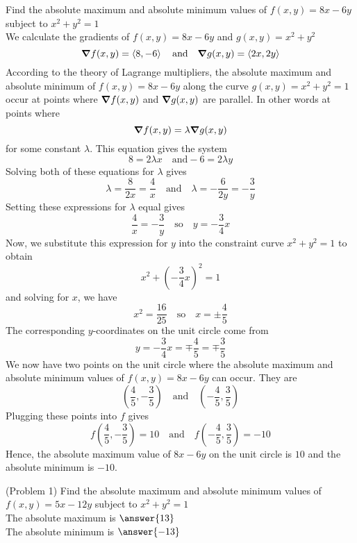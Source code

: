 \documentclass[handout]{ximera}
\begin{document}
\begin{example}[Example 1]
Find the absolute maximum and absolute minimum values of $f(x,y) = 8x - 6y$ subject to $x^2 + y^2 = 1$\\
We calculate the gradients of $f(x,y) = 8x - 6y$ and $g(x,y) = x^2 + y^2$
\[
\boldsymbol\nabla f(x,y) = \left\langle 8, -6\right\rangle \quad \text{and} \quad \boldsymbol\nabla g(x,y) = \left\langle 2x, 2y\right\rangle
\]
According to the theory of Lagrange multipliers, the absolute maximum and absolute minimum of $f(x,y) = 8x - 6y$
along the curve $g(x,y) = x^2 + y^2 = 1$ occur at points where $\boldsymbol\nabla f(x,y)$ and $\boldsymbol\nabla g(x,y)$ are parallel.  In other words at points where
\[
\boldsymbol\nabla f(x,y) = \lambda \boldsymbol\nabla g(x,y)
\]
for some constant $\lambda$.
This equation gives the system
\[
8 = 2\lambda x \quad \text{and} -6 = 2\lambda y
\]
Solving both of these equations for $\lambda$ gives
\[
\lambda = \frac{8}{2x} = \frac{4}{x} \quad \text{and} \quad \lambda = -\frac{6}{2y} = -\frac{3}{y}
\]
Setting these expressions for $\lambda$ equal gives
\[
\frac{4}{x} = -\frac{3}{y} \quad \text{so} \quad y = -\frac34 x
\]
Now, we substitute this expression for $y$ into the constraint curve $x^2 + y^2 = 1$ to obtain
\[
x^2 + \left(-\frac34 x\right)^2 = 1
\]
and solving for $x$, we have
\[
x^2 = \frac{16}{25} \quad \text{so} \quad x = \pm \frac45
\]
The corresponding $y$-coordinates on the unit circle come from 
\[
y = -\frac34 x = \mp \frac45 = \mp \frac35
\]
We now have two points on the unit circle where the absolute maximum and absolute minimum values of $f(x,y) = 8x - 6y$ can occur.
They are
\[
\left(\frac45, -\frac35\right) \quad \text{and} \quad \left(-\frac45, \frac35\right)
\]
Plugging these points into $f$ gives
\[
f\left(\frac45, -\frac35\right) = 10 \quad \text{and} \quad f\left(-\frac45, \frac35\right) = -10
\]
Hence, the absolute maximum value of $8x -6y$ on the unit circle is $10$ and the absolute minimum is $-10$.
\end{example}

\begin{problem}(Problem 1)
Find the absolute maximum and absolute minimum values of $f(x,y) = 5x -12y$ subject to $x^2 + y^2 = 1$\\
The absolute maximum is $\answer{13}$\\
The absolute minimum is $\answer{-13}$
\end{problem}
\end{document}
